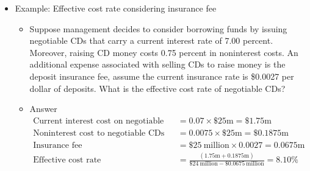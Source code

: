 \begin{itemize}
\begin{itemize}
    Current interest cost on Federal funds = 0.06 x \$25m = \$1.5m

    
Noninterest cost to access Federal funds raised = 0.0025 x \$25m = \$0.063m

\begin{align*}
    \text{The effective annualized Fed funds cost rate} &= \frac{\$1.5\ \text{m} + \$0.063\ \text{m}}{\$24\ \text{m}} \\
    &= 6.51\%
    \end{align*}
    \end{itemize}

\item Example: Effective cost rate considering insurance fee
    \begin{itemize}
    \item Suppose management decides to consider borrowing funds by issuing negotiable CDs that carry a current interest rate of 7.00 percent. Moreover, raising CD money costs 0.75 percent in noninterest costs. An additional expense associated with selling CDs to raise money is the deposit insurance fee, assume the current insurance rate is \$0.0027 per dollar of deposits. What is the effective cost rate of negotiable CDs?
    \item Answer
    \begin{align*}
        \text{Current interest cost on negotiable CDs} &= 0.07\times\$25\text{m} = \$1.75\text{m}\\
        \text{Noninterest cost to negotiable CDs} &= 0.0075\times\$25\text{m} = \$0.1875\text{m}\\
        \text{Insurance fee} &= \$25\ \text{million}\times0.0027 = 0.0675\text{m}\\
        \text{Effective cost rate} &= \frac{(1.75\text{m}+0.1875\text{m})}{\$24\ \text{million}-\$0.0675\ \text{million}} = 8.10\%
        \end{align*}
    \end{itemize}


\end{itemize}
